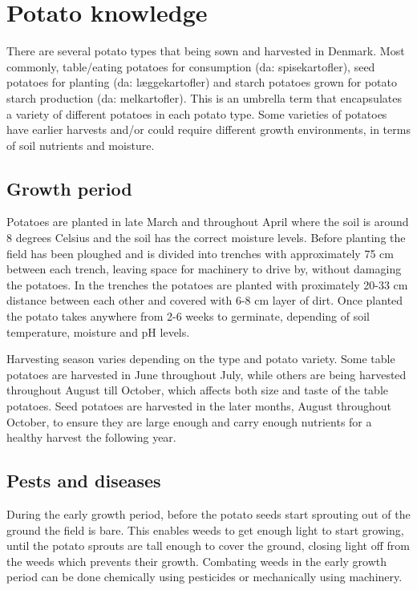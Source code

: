 \section{Potato knowledge} \label{Potato knowledge}
There are several potato types that being sown and harvested in Denmark. Most commonly, table/eating potatoes for consumption (da: spisekartofler), seed potatoes for planting (da: læggekartofler) and starch potatoes grown for potato starch production (da: melkartofler).
This is an umbrella term that encapsulates a variety of different potatoes in each potato type. Some varieties of potatoes have earlier harvests and/or could require different growth environments, in terms of soil nutrients and moisture. 

\subsection{Growth period} \label{Growth Period}
Potatoes are planted in late March and throughout April where the soil is around 8 degrees Celsius and the soil has the correct moisture levels\cite{LandbrugogFødevarer}. Before planting the field has been ploughed and is divided into trenches with approximately 75 cm between each trench, leaving space for machinery to drive by, without damaging the potatoes. In the trenches the potatoes are planted with proximately 20-33 cm distance between each other and covered with 6-8 cm layer of dirt\cite{LandbrugogFødevarer}. Once planted the potato takes anywhere from 2-6 weeks to germinate, depending of soil temperature, moisture and pH levels\cite{vegtotable_potato_germination}.

Harvesting season varies depending on the type and potato variety. Some table potatoes are harvested in June throughout July, while others are being harvested throughout August till October, which affects both size and taste of the table potatoes. Seed potatoes are harvested in the later months, August throughout October, to ensure they are large enough and carry enough nutrients for a healthy harvest the following year\cite{PPOplæg}.

\subsection{Pests and diseases}\label{Pests and diseas}
During the early growth period, before the potato seeds start sprouting out of the ground the field is bare. This enables weeds to get enough light to start growing, until the potato sprouts are tall enough to cover the ground, closing light off from the weeds which prevents their growth. Combating weeds in the early growth period can be done chemically using pesticides or mechanically using machinery\cite{LandbrugogFødevarer}.

